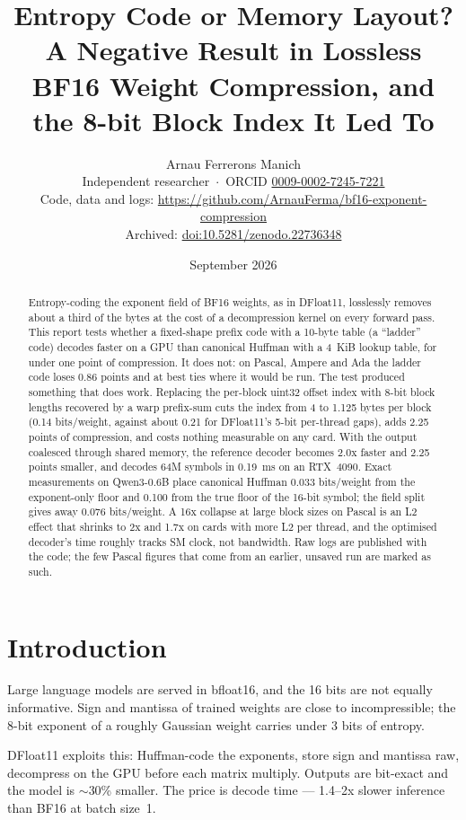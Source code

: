 \documentclass[11pt,a4paper]{article}
\title{Entropy Code or Memory Layout? A Negative Result in Lossless BF16 Weight Compression, and the 8-bit Block Index It Led To}
\author{Arnau Ferrerons Manich\\
\small Independent researcher \,$\cdot$\, ORCID \href{https://orcid.org/0009-0002-7245-7221}{0009-0002-7245-7221}\\
\small Code, data and logs: \url{https://github.com/ArnauFerma/bf16-exponent-compression}\\
\small Archived: \href{https://doi.org/10.5281/zenodo.22736348}{doi:10.5281/zenodo.22736348}}
\date{September 2026}
\begin{document}
\maketitle

\begin{abstract}
Entropy-coding the exponent field of BF16 weights, as in DFloat11, losslessly removes about a third of the bytes at the cost of a decompression kernel on every forward pass. This report tests whether a fixed-shape prefix code with a 10-byte table (a ``ladder'' code) decodes faster on a GPU than canonical Huffman with a 4~KiB lookup table, for under one point of compression. It does not: on Pascal, Ampere and Ada the ladder code loses 0.86 points and at best ties where it would be run. The test produced something that does work. Replacing the per-block uint32 offset index with 8-bit block lengths recovered by a warp prefix-sum cuts the index from 4 to 1.125 bytes per block (0.14 bits/weight, against about 0.21 for DFloat11's 5-bit per-thread gaps), adds 2.25 points of compression, and costs nothing measurable on any card. With the output coalesced through shared memory, the reference decoder becomes 2.0x faster and 2.25 points smaller, and decodes 64M symbols in 0.19~ms on an RTX~4090. Exact measurements on Qwen3-0.6B place canonical Huffman 0.033 bits/weight from the exponent-only floor and 0.100 from the true floor of the 16-bit symbol; the field split gives away 0.076 bits/weight. A 16x collapse at large block sizes on Pascal is an L2 effect that shrinks to 2x and 1.7x on cards with more L2 per thread, and the optimised decoder's time roughly tracks SM clock, not bandwidth. Raw logs are published with the code; the few Pascal figures that come from an earlier, unsaved run are marked as such.
\end{abstract}

\section{Introduction}

Large language models are served in bfloat16, and the 16 bits are not equally informative. Sign and mantissa of trained weights are close to incompressible; the 8-bit exponent of a roughly Gaussian weight carries under 3 bits of entropy.

DFloat11 \cite{dfloat11} exploits this: Huffman-code the exponents, store sign and mantissa raw, decompress on the GPU before each matrix multiply. Outputs are bit-exact and the model is $\sim$30\% smaller. The price is decode time --- 1.4--2x slower inference than BF16 at batch size~1.
\end{document}
